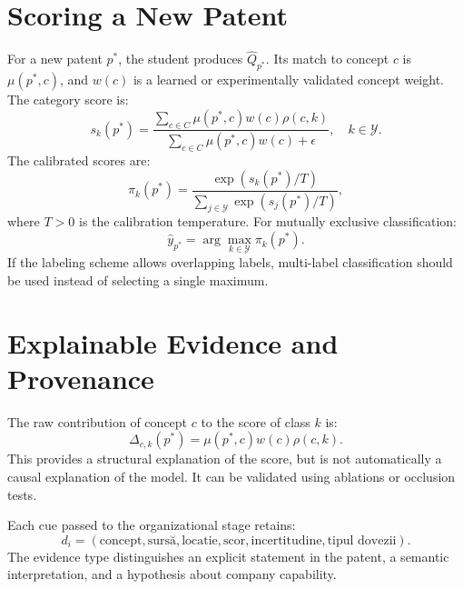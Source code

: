 \documentclass[11pt,a4paper]{article}
\begin{document}
\section{Scoring a New Patent}
For a new patent $p^*$, the student produces $\hat{Q}_{p^*}$. Its match to concept $c$ is $\mu(p^*,c)$, and $w(c)$ is a learned or experimentally validated concept weight. The category score is:
\begin{equation}
s_k(p^*)=
\frac{\sum_{c\in C}\mu(p^*,c)w(c)\rho(c,k)}
{\sum_{c\in C}\mu(p^*,c)w(c)+\epsilon},
\quad k\in\mathcal{Y}.
\end{equation}
The calibrated scores are:
\begin{equation}
\pi_k(p^*)=\frac{\exp(s_k(p^*)/T)}
{\sum_{j\in\mathcal{Y}}\exp(s_j(p^*)/T)},
\end{equation}
where $T>0$ is the calibration temperature. For mutually exclusive classification:
\begin{equation}
\hat{y}_{p^*}=\arg\max_{k\in\mathcal{Y}}\pi_k(p^*).
\end{equation}
If the labeling scheme allows overlapping labels, multi-label classification should be used instead of selecting a single maximum.

\section{Explainable Evidence and Provenance}
The raw contribution of concept $c$ to the score of class $k$ is:
\begin{equation}
\Delta_{c,k}(p^*)=\mu(p^*,c)w(c)\rho(c,k).
\end{equation}
This provides a structural explanation of the score, but is not automatically a causal explanation of the model. It can be validated using ablations or occlusion tests.

Each cue passed to the organizational stage retains:
\begin{equation}
d_i=(\text{concept},\text{surs\u{a}},\text{loca\u{t}ie},
\text{scor},\text{incertitudine},\text{tipul dovezii}).
\end{equation}
The evidence type distinguishes an explicit statement in the patent, a semantic interpretation, and a hypothesis about company capability.
\end{document}
